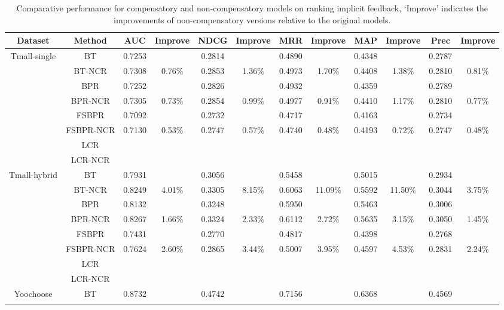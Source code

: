 \documentclass[letterpaper]{article} %
\begin{document}
\begin{table*}[htp]
\tiny
\caption{Comparative performance for compensatory and non-compensatory models on ranking implicit feedback, `Improve' indicates the improvements of non-compensatory versions relative to the original models.}
\begin{center}
\begin{tabular}{|c|c|c|c|c|c|c|c|c|c|c|c|}
\hline
Dataset	& Method	&AUC	&Improve	&NDCG	&Improve	&MRR	&Improve	&MAP	&Improve&	Prec&	Improve\\\hline
\multirow{8}{*}{Tmall-single} &	BT	&0.7253 	&&	0.2814 	&&	0.4890 	&&	0.4348 	&&	0.2787 &\\\cline{2-12}	
	&BT-NCR	&0.7308 	&0.76$\%$&	0.2853 	&1.36$\%$&	0.4973 &1.70$\%$	&0.4408 &	1.38$\%$&	0.2810 	&0.81$\%$\\\cline{2-12}
	&BPR	&0.7252 	&&	0.2826 &&		0.4932 		&&0.4359 	&&	0.2789 	&\\\cline{2-12}
	&BPR-NCR	&0.7305 	&0.73$\%$&	0.2854 	&0.99$\%$&	0.4977 &	0.91$\%$&	0.4410 	&1.17$\%$&	0.2810 &	0.77$\%$\\\cline{2-12}
	&FSBPR	&0.7092 	&&	0.2732 	&&	0.4717 	&&	0.4163 	&&	0.2734 	&\\\cline{2-12}
	&FSBPR-NCR&	0.7130 &	0.53$\%$&	0.2747 &	0.57$\%$&	0.4740 	&0.48$\%$&	0.4193 &	0.72$\%$&	0.2747 	&0.48$\%$\\\cline{2-12}
	&LCR	&&&&&&&&&&\\				\cline{2-12}					
	&LCR-NCR	&&&&&&&&&&		\\\hline							
\multirow{8}{*}{Tmall-hybrid}	&BT	&0.7931 	&&	0.3056 	&&	0.5458 	&&	0.5015 	&&	0.2934 	&\\\cline{2-12}
	&BT-NCR	&0.8249 	&4.01$\%$&	0.3305 	&8.15$\%$&	0.6063 	&11.09$\%$	&0.5592 	&11.50$\%$&	0.3044 	&3.75$\%$\\\cline{2-12}
	&BPR	&0.8132 		&&0.3248 	&&	0.5950 	&&	0.5463 	&&	0.3006 	&\\\cline{2-12}
	&BPR-NCR	&0.8267 &	1.66$\%$	&0.3324 	&2.33$\%$	&0.6112 &	2.72$\%$&	0.5635 &	3.15$\%$&	0.3050 	&1.45$\%$\\\cline{2-12}
	&FSBPR	&0.7431 	&&	0.2770 	&&	0.4817 	&&	0.4398 	&&	0.2768 	&\\\cline{2-12}
	&FSBPR-NCR	&0.7624 	&2.60$\%$&	0.2865 	&3.44$\%$&	0.5007 &	3.95$\%$&	0.4597 	&4.53$\%$&	0.2831 &	2.24$\%$\\\cline{2-12}
	&LCR	&&&&&&&&&&						\\\cline{2-12}			
	&LCR-NCR	&&&&&&&&&&							\\\hline		
\multirow{8}{*}{Yoochoose} &	BT	&0.8732 &&		0.4742 	&&	0.7156 	&&	0.6368 	&&	0.4569 	&\\\cline{2-12}

\end{tabular}
\end{center}
\end{table*}
\end{document}
